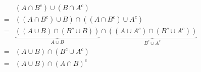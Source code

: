 {\color{solution}
\begin{align*}
&(A \cap  {B^c}) \cup (B \cap  {A^c}) \\
=& ((A \cap  {B^c}) \cup B) \cap ( (A \cap  {B^c}) \cup  {A^c})\\
=& \underbrace{((A \cup B) \cap ( {B^c} \cup B))}_{A \cup B} \cap 
\underbrace{( (A \cup   {A^c}) \cap ( {B^c} \cup  {A^c}))}_{ {B^c} \cup  {A^c}}\\
=& (A \cup B) \cap ( {B^c} \cup {A^c})\\
=& (A \cup B) \cap  {(A \cap B)^c}
\end{align*}
}